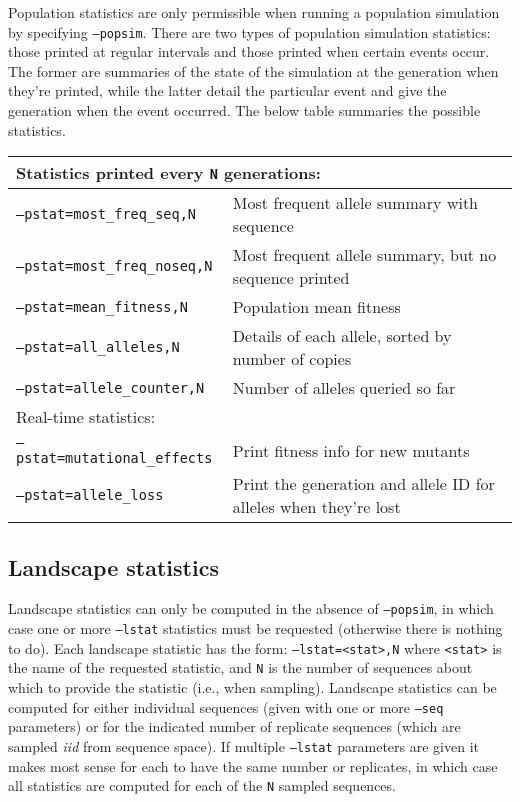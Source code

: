 \documentclass[11pt]{article}
\begin{document}
Population statistics are only permissible when running a population simulation by specifying \texttt{--popsim}. There are two types of population simulation statistics: those printed at regular intervals and those printed when certain events occur. The former are summaries of the state of the simulation at the generation when they're printed, while the latter detail the particular event and give the generation when the event occurred. The below table summaries the possible statistics. 

\begin{tabular}{l|p{8cm}}
\hline
\multicolumn{2}{l}{Statistics printed every \texttt{N} generations:} \\
\hline
\texttt{--pstat=most\_freq\_seq,N}     & Most frequent allele summary with sequence \\
\texttt{--pstat=most\_freq\_noseq,N}   & Most frequent allele summary, but no sequence printed \\
\texttt{--pstat=mean\_fitness,N}       & Population mean fitness \\
\texttt{--pstat=all\_alleles,N}        & Details of each allele, sorted by number of copies \\
\texttt{--pstat=allele\_counter,N}     & Number of alleles queried so far \\
\hline
\hline
\multicolumn{2}{l}{Real-time statistics:} \\
\hline
\texttt{--pstat=mutational\_effects} & Print fitness info for new mutants \\
\texttt{--pstat=allele\_loss}        & Print the generation and allele ID for alleles when they're lost \\
\hline
\end{tabular}

\subsection{Landscape statistics}

Landscape statistics can only be computed in the absence of \texttt{--popsim}, in which case one or more \texttt{--lstat} statistics must be requested (otherwise there is nothing to do). Each landscape statistic has the form: \texttt{--lstat=<stat>,N} where \texttt{<stat>} is the name of the requested statistic, and \texttt{N} is the number of sequences about which to provide the statistic (i.e., when sampling). Landscape statistics can be computed for either individual sequences (given with one or more \texttt{--seq} parameters) or for the indicated number of replicate sequences (which are sampled \emph{iid} from sequence space). If multiple \texttt{--lstat} parameters are given it makes most sense for each to have the same number or replicates, in which case all statistics are computed for each of the \texttt{N} sampled sequences.
\end{document}
